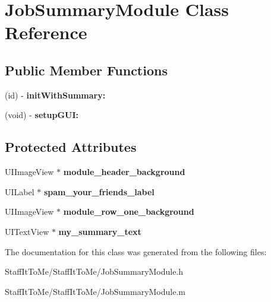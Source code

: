 \hypertarget{interface_job_summary_module}{
\section{\-Job\-Summary\-Module \-Class \-Reference}
\label{interface_job_summary_module}
}
\subsection*{\-Public \-Member \-Functions}
\begin{DoxyCompactItemize}
\item 
\hypertarget{interface_job_summary_module_a027af6d107140c44f6eb893bb8e73160}{
(id) -\/ {\bfseries init\-With\-Summary\-:}}
\label{interface_job_summary_module_a027af6d107140c44f6eb893bb8e73160}

\item 
\hypertarget{interface_job_summary_module_a9a030809d356582f25caeafdb7f86f97}{
(void) -\/ {\bfseries setup\-G\-U\-I\-:}}
\label{interface_job_summary_module_a9a030809d356582f25caeafdb7f86f97}

\end{DoxyCompactItemize}
\subsection*{\-Protected \-Attributes}
\begin{DoxyCompactItemize}
\item 
\hypertarget{interface_job_summary_module_a703b831e15ada96513e7fef8a57ca237}{
\-U\-I\-Image\-View $\ast$ {\bfseries module\-\_\-header\-\_\-background}}
\label{interface_job_summary_module_a703b831e15ada96513e7fef8a57ca237}

\item 
\hypertarget{interface_job_summary_module_a946b9c2bbbae9966e04a58d3c0e506a6}{
\-U\-I\-Label $\ast$ {\bfseries spam\-\_\-your\-\_\-friends\-\_\-label}}
\label{interface_job_summary_module_a946b9c2bbbae9966e04a58d3c0e506a6}

\item 
\hypertarget{interface_job_summary_module_a0f86b889b925a651858a0b08b504efd8}{
\-U\-I\-Image\-View $\ast$ {\bfseries module\-\_\-row\-\_\-one\-\_\-background}}
\label{interface_job_summary_module_a0f86b889b925a651858a0b08b504efd8}

\item 
\hypertarget{interface_job_summary_module_a25dfc7cf6d6db2301655283975ce494f}{
\-U\-I\-Text\-View $\ast$ {\bfseries my\-\_\-summary\-\_\-text}}
\label{interface_job_summary_module_a25dfc7cf6d6db2301655283975ce494f}

\end{DoxyCompactItemize}


\-The documentation for this class was generated from the following files\-:\begin{DoxyCompactItemize}
\item 
\-Staff\-It\-To\-Me/\-Staff\-It\-To\-Me/\-Job\-Summary\-Module.\-h\item 
\-Staff\-It\-To\-Me/\-Staff\-It\-To\-Me/\-Job\-Summary\-Module.\-m\end{DoxyCompactItemize}

